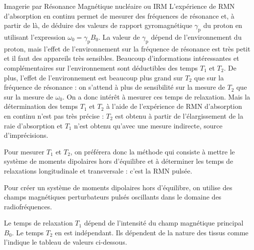 \begin{exo}[PC][1][devoir]{Imagerie par Résonance Magnétique nucléaire ou IRM}
L'expérience de RMN d'absorption en continu permet de mesurer des fréquences de résonance et, à partir de là, de déduire des valeurs de rapport gyromagnétique $\gamma_{\mathrm{p}}$ du proton en utilisant l'expression $\omega_{0}=\gamma_{\mathrm{p}} B_0$. La valeur de $\gamma_{\mathrm{p}}$ dépend de l'environnement du proton, mais l'effet de l'environnement sur la fréquence de résonance est très petit et il faut des appareils très sensibles. Beaucoup d'informations intéressantes et complémentaires sur l'environnement sont déductibles des temps ${T}_{1}$ et $T_{2}$. De plus, l'effet de l'environnement est beaucoup plus grand sur $T_{2}$ que sur la fréquence de résonance : on s'attend à plus de sensibilité sur la mesure de $T_{2}$ que sur la mesure de $\omega_{0}$. On a donc intérêt à mesurer ces temps de relaxation. Mais la détermination des temps ${T}_{1}$ et ${T}_{2}$ à l'aide de l'expérience de RMN d'absorption en continu n'est pas très précise : ${T}_{2}$ est obtenu à partir de l'élargissement de la raie d'absorption et ${T}_{1}$ n'est obtenu qu'avec une mesure indirecte, source d'imprécisions.

Pour mesurer $T_{1}$ et $T_{2}$, on préférera donc la méthode qui consiste à mettre le système de moments dipolaires hors d'équilibre et à déterminer les temps de relaxations longitudinale et transversale : c'est la RMN pulsée.

Pour créer un système de moments dipolaires hors d'équilibre, on utilise des champs magnétiques perturbateurs pulsés oscillants dans le domaine des radiofréquences.


Le temps de relaxation ${T}_{1}$ dépend de l'intensité du champ magnétique principal $B_0$. Le temps ${T}_{2}$ en est indépendant. Ils dépendent de la nature des tissus comme l'indique le tableau de valeurs ci-dessous.

\begin{center}


\end{center}
\end{exo}
